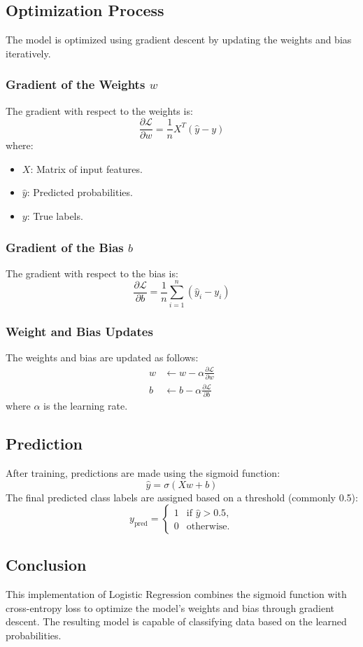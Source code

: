 \documentclass{article}
\begin{document}
\subsection*{Optimization Process}
The model is optimized using gradient descent by updating the weights and bias iteratively.

\subsubsection*{Gradient of the Weights \( w \)}
The gradient with respect to the weights is:
\[
\frac{\partial \mathcal{L}}{\partial w} = \frac{1}{n} X^T (\hat{y} - y)
\]
where:
\begin{itemize}
    \item \( X \): Matrix of input features.
    \item \( \hat{y} \): Predicted probabilities.
    \item \( y \): True labels.
\end{itemize}

\subsubsection*{Gradient of the Bias \( b \)}
The gradient with respect to the bias is:
\[
\frac{\partial \mathcal{L}}{\partial b} = \frac{1}{n} \sum_{i=1}^n (\hat{y}_i - y_i)
\]

\subsubsection*{Weight and Bias Updates}
The weights and bias are updated as follows:
\[
\begin{aligned}
    w &\leftarrow w - \alpha \frac{\partial \mathcal{L}}{\partial w} \\
    b &\leftarrow b - \alpha \frac{\partial \mathcal{L}}{\partial b}
\end{aligned}
\]
where \( \alpha \) is the learning rate.

\subsection*{Prediction}
After training, predictions are made using the sigmoid function:
\[
\hat{y} = \sigma(Xw + b)
\]
The final predicted class labels are assigned based on a threshold (commonly 0.5):
\[
y_\text{pred} = \begin{cases} 
    1 & \text{if } \hat{y} > 0.5, \\
    0 & \text{otherwise.}
\end{cases}
\]

\subsection*{Conclusion}
This implementation of Logistic Regression combines the sigmoid function with cross-entropy loss to optimize the model's weights and bias through gradient descent. The resulting model is capable of classifying data based on the learned probabilities.
\end{document}
